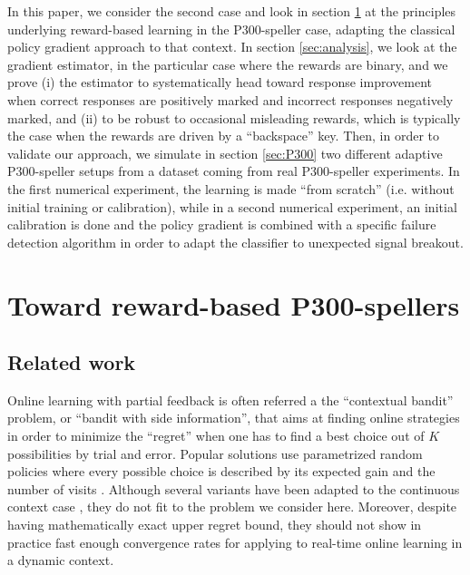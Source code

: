 \documentclass[conference]{IEEEtran}
\begin{document}
In this paper, we consider the second case and 
look in section \ref{sec:principles} at the principles underlying reward-based learning in the P300-speller case,
adapting the classical policy gradient approach \cite{Wil92} to that context.
In section \ref{sec:analysis},  
we look at the gradient estimator, in the particular case where the rewards are binary, 
and we prove (i) the estimator to systematically head toward response improvement when correct responses are positively 
marked and incorrect responses negatively marked, and (ii) to be
robust to occasional misleading rewards, which is typically the case when the rewards are driven by a ``backspace'' key. 
Then, in order to validate our approach, 
we simulate in section \ref{sec:P300} two different adaptive P300-speller setups 
from a dataset coming from real P300-speller experiments.
In the first numerical experiment, the learning is made ``from scratch'' 
(i.e. without initial training or calibration), while in a second numerical experiment, 
an initial calibration is done and the policy
gradient is combined with a specific failure detection algorithm
in order to adapt the classifier to unexpected signal breakout.

\section{Toward reward-based P300-spellers}\label{sec:principles}

\subsection{Related work} 
Online learning with partial feedback is often referred a the ``contextual bandit'' problem, or
``bandit with side information'', that aims at finding online strategies in order to minimize the ``regret''  
when one has to find a best choice out of $K$ possibilities by trial and error. Popular solutions use
parametrized random policies where every possible choice is described by its expected gain and the number of visits
\cite{Auer02}. %
Although several variants have been adapted to the continuous context case \cite{Kakade08,Hazan11,Crammer11}, they  
do not fit to the problem we consider here.
Moreover, despite having mathematically exact upper regret bound, they should not show in practice fast enough convergence rates 
for applying to real-time online learning in a dynamic context.
\end{document}
